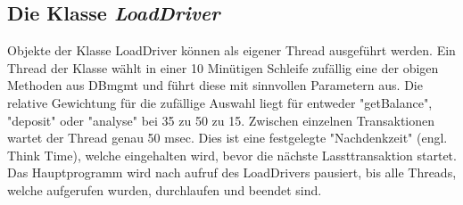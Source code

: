 	\subsection{Die Klasse \emph{LoadDriver}}
	Objekte der Klasse LoadDriver können als eigener Thread ausgeführt werden. Ein Thread der Klasse wählt in einer 10 Minütigen Schleife zufällig eine der obigen Methoden aus DBmgmt und führt diese mit sinnvollen Parametern aus. Die relative Gewichtung für die zufällige Auswahl liegt für entweder "getBalance", "deposit" oder "analyse" bei 35 zu 50 zu 15. Zwischen einzelnen Transaktionen wartet der Thread genau 50 msec. Dies ist eine festgelegte "Nachdenkzeit" (engl. Think Time), welche eingehalten wird, bevor die nächste Lassttransaktion startet.
Das Hauptprogramm wird nach aufruf des LoadDrivers pausiert, bis alle Threads, welche aufgerufen wurden, durchlaufen und beendet sind.

